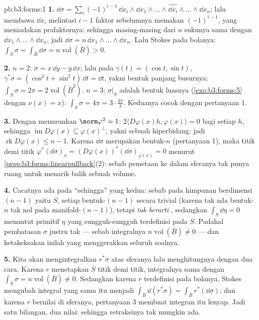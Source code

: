 \begin{solution}{pb:b3:forms:1}
\textbf{1.} $\dd\sigma = \sum_i(-1)^{i-1}\,\dd x_i\wedge\dd
x_1\wedge\dots\wedge\widehat{\dd x_i}\wedge\dots\wedge\dd
x_n$; lalu membawa $\dd x_i$ melintasi $i-1$ faktor sebelumnya
memakan $(-1)^{i-1}$, yang meniadakan prafaktornya: sehingga masing-masing dari
$n$ sukunya sama dengan $\dd x_1\wedge\dots\wedge\dd x_n$, jadi
$\dd\sigma = n\,\dd x_1\wedge\dots\wedge\dd x_n$. Lalu Stokes pada
bolanya: $\int_S\sigma = \int_{\bar B}\dd\sigma =
n\operatorname{vol}(\bar B) > 0$.

\textbf{2.} $n = 2$: $\sigma = x\,\dd y - y\,\dd x$; lalu pada
$\gamma(t) = (\cos t, \sin t)$, $\gamma^*\sigma = (\cos^2t +
\sin^2t)\,\dd t = \dd t$, yakni bentuk panjang busurnya:
$\int_S\sigma = 2\pi = 2\operatorname{vol}(\bar B^2)$.
$n = 3$: $\sigma\vert_S$ adalah bentuk luasnya
(\cref{exo:b3:forms:5} dengan $\nu(x) = x$):
$\int_S\sigma = 4\pi = 3\cdot\tfrac{4\pi}3$. Keduanya cocok dengan
pertanyaan 1.

\textbf{3.} Dengan menurunkan $\norm\varphi^2 = 1$: $2\langle
D\varphi(x)h, \varphi(x)\rangle = 0$ bagi setiap $h$, sehingga
$\operatorname{im}D\varphi(x) \subseteq \varphi(x)^\perp$, yakni sebuah
hiperbidang: jadi $\operatorname{rk}D\varphi(x) \leq n - 1$. Karena
$\dd\sigma$ merupakan bentuk-$n$ (pertanyaan 1), maka titik demi titik
$\varphi^*(\dd\sigma)_x =
(D\varphi(x))^*(\dd\sigma)_{\varphi(x)} = 0$ menurut
\cref{prop:b3:forms:linearpullback}(2): sebab pemetaan ke dalam
sferanya tak punya ruang untuk menarik balik sebuah volume.

\textbf{4.} Cacatnya ada pada ``sehingga'' yang kedua: sebab pada
himpunan berdimensi $(n-1)$ yaitu $S$, setiap bentuk-$(n-1)$  secara
trivial (karena tak ada bentuk-$n$ tak nol pada
manifold-$(n-1)$), tetapi \emph{ tak berarti },
sedangkan $\int_S\dd\eta = 0$ menuntut primitif $\eta$ yang sungguh-sungguh
terdefinisi pada $S$. Padahal pembatasan $\sigma$ justru tak
 --- sebab integralnya $n\operatorname{vol}(\bar B) \neq
0$ --- dan ketakeksakan inilah yang menggerakkan seluruh soalnya.

\textbf{5.} Kita akan mengintegralkan $r^*\sigma$ atas sferanya
lalu menghitungnya dengan dua cara. Karena $r$ menetapkan $S$ titik demi titik,
integralnya sama dengan $\int_S\sigma = n\operatorname{vol}(\bar B)
\neq 0$. Sedangkan karena $r$ terdefinisi pada bolanya, Stokes mengubah
integral yang sama itu menjadi $\int_{\bar B}\dd(r^*\sigma) =
\int_{\bar B}r^*(\dd\sigma)$; dan karena $r$ bernilai
di sferanya, pertanyaan 3 membuat integran itu lenyap. Jadi satu
bilangan, dua nilai: sehingga retraksinya tak mungkin ada.


\end{solution}
